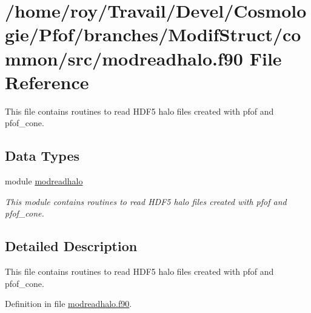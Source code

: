 \hypertarget{modreadhalo_8f90}{\section{/home/roy/\-Travail/\-Devel/\-Cosmologie/\-Pfof/branches/\-Modif\-Struct/common/src/modreadhalo.f90 File Reference}
\label{modreadhalo_8f90}
}


This file contains routines to read H\-D\-F5 halo files created with pfof and pfof\-\_\-cone.  


\subsection*{Data Types}
\begin{DoxyCompactItemize}
\item 
module \hyperlink{classmodreadhalo}{modreadhalo}
\begin{DoxyCompactList}\small\item\em This module contains routines to read H\-D\-F5 halo files created with pfof and pfof\-\_\-cone. \end{DoxyCompactList}\end{DoxyCompactItemize}


\subsection{Detailed Description}
This file contains routines to read H\-D\-F5 halo files created with pfof and pfof\-\_\-cone. 

Definition in file \hyperlink{modreadhalo_8f90_source}{modreadhalo.\-f90}.

